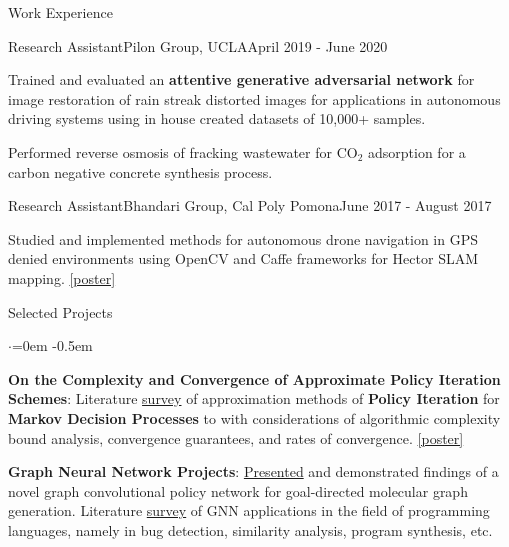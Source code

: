 \documentclass{resume}
\begin{document}
\begin{rSection}{Work Experience}
    \begin{rSubsection}{Research Assistant}{Pilon Group, UCLA}{April 2019 - June 2020}
        \item Trained and evaluated an \textbf{attentive generative adversarial network} for image restoration of rain streak distorted
        images for applications in autonomous driving systems using in house created datasets of 10,000+ samples.
        \item Performed reverse osmosis of fracking wastewater for $\text{CO}_2$ adsorption for a carbon negative concrete synthesis process.
    \end{rSubsection}
    \begin{rSubsection}{Research Assistant}{\small Bhandari Group, Cal Poly Pomona}{June 2017 - August 2017}
        \item Studied and implemented methods for autonomous drone navigation in GPS denied environments using OpenCV and Caffe frameworks for Hector SLAM mapping.
        \href{https://docs.google.com/presentation/d/1fp-MPZUgKS_PhMD90d4aL0Rh0-YfghnEYHb3sHKmnGE/edit?usp=sharing}{[poster]}
    \end{rSubsection}
\end{rSection}

\begin{rSection}{Selected Projects}
    \vspace{0.5em}
    \begin{list}{$\cdot$}{\leftmargin=0em}
      \itemsep -0.5em \vspace{-0.5em}
        \item {\bf On the Complexity and Convergence of Approximate Policy Iteration Schemes}:
        Literature \href{https://github.com/joostinyi/ECE239AS/blob/master/RL_S20.pdf}{survey} of approximation methods of \textbf{Policy Iteration}
        for \textbf{Markov Decision Processes} to with considerations of algorithmic complexity bound analysis, convergence guarantees, and rates of convergence. 
        \href{https://github.com/joostinyi/ECE239AS/blob/master/Approximate-Policy-Iteration-Poster.pdf}{[poster]}
        \item {\bf Graph Neural Network Projects}:
        \href{https://github.com/yichousun/Winter2021_CS249_GNN/tree/main/Paper_Presentation/Graph_Synthesis/GCPN}{Presented} and demonstrated findings of a novel graph convolutional policy network for goal-directed molecular graph generation.
        Literature \href{https://github.com/Sripathm2/GNNSurvey}{survey} of GNN applications in the field of programming languages, namely in bug detection, similarity analysis, program synthesis, etc.
    \end{list}
    \end{rSection}
\end{document}
